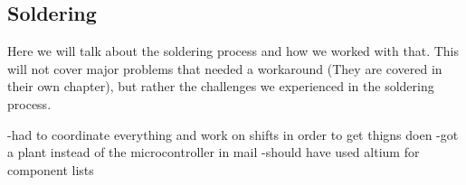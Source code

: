 \subsection{Soldering} \label{pcb:process:ss:soldering}

Here we will talk about the soldering process and how we worked with that.
This will not cover major problems that needed a workaround (They are covered in their own chapter), but rather the challenges we experienced in the soldering process.

-had to coordinate everything and work on shifts in order to get thigns doen
-got a plant instead of the microcontroller in mail
-should have used altium for component lists
